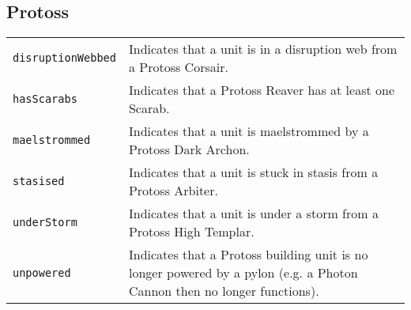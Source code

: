 \subsection{Protoss}
\begin{tabularx}{\textwidth}{lX}
 \verb|disruptionWebbed| & Indicates that a unit is in a disruption web from a Protoss Corsair. \\
 \verb|hasScarabs| & Indicates that a Protoss Reaver has at least one Scarab. \\
 \verb|maelstrommed| & Indicates that a unit is maelstrommed by a Protoss Dark Archon. \\
 \verb|stasised| & Indicates that a unit is stuck in stasis from a Protoss Arbiter. \\
 \verb|underStorm| & Indicates that a unit is under a storm from a Protoss High Templar. \\
 \verb|unpowered| & Indicates that a Protoss building unit is no longer powered by a pylon (e.g. a Photon Cannon then no longer functions).
\end{tabularx}
